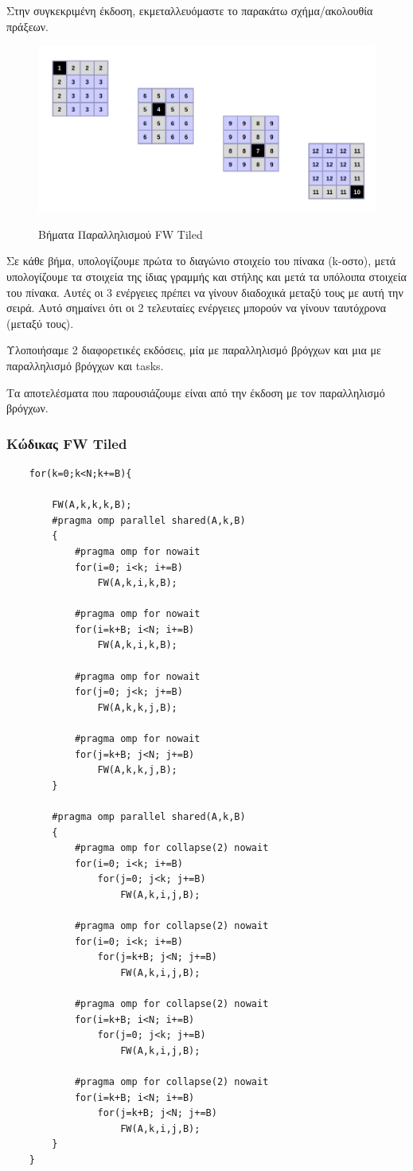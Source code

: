\documentclass[letterpaper,12pt]{article}
\begin{document}
Στην συγκεκριμένη έκδοση, εκμεταλλευόμαστε το παρακάτω σχήμα/ακολουθία πράξεων.

\begin{figure}[H]
    \centering
    \caption{Βήματα Παραλληλισμού FW Tiled}
    \includegraphics[scale=0.5]{tiledDependencies.png}
    \label{fig: Βήματα Παραλληλισμού FW Tiled}
\end{figure}

Σε κάθε βήμα, υπολογίζουμε πρώτα το διαγώνιο στοιχείο του πίνακα (k-οστο),
μετά υπολογίζουμε τα στοιχεία της ίδιας γραμμής και στήλης και μετά τα υπόλοιπα
στοιχεία του πίνακα. Αυτές οι 3 ενέργειες πρέπει να γίνουν διαδοχικά μεταξύ τους με
αυτή την σειρά. Αυτό σημαίνει ότι οι 2 τελευταίες ενέργειες μπορούν να γίνουν ταυτόχρονα (μεταξύ τους).

Υλοποιήσαμε 2 διαφορετικές εκδόσεις, μία με παραλληλισμό βρόγχων και μια με παραλληλισμό
βρόγχων και tasks.

Τα αποτελέσματα που παρουσιάζουμε είναι από την έκδοση με τον παραλληλισμό βρόγχων.

\subsubsection*{Κώδικας FW Tiled}


\begin{lstlisting}
    for(k=0;k<N;k+=B){

		FW(A,k,k,k,B);
		#pragma omp parallel shared(A,k,B)
		{
			#pragma omp for nowait
			for(i=0; i<k; i+=B)
				FW(A,k,i,k,B);

			#pragma omp for nowait
			for(i=k+B; i<N; i+=B)
				FW(A,k,i,k,B);

			#pragma omp for nowait
			for(j=0; j<k; j+=B)
				FW(A,k,k,j,B);

			#pragma omp for nowait
			for(j=k+B; j<N; j+=B)	
				FW(A,k,k,j,B);
		}

		#pragma omp parallel shared(A,k,B)
		{
			#pragma omp for collapse(2) nowait
			for(i=0; i<k; i+=B)
				for(j=0; j<k; j+=B)
					FW(A,k,i,j,B);

			#pragma omp for collapse(2) nowait
			for(i=0; i<k; i+=B)
				for(j=k+B; j<N; j+=B)
					FW(A,k,i,j,B);

			#pragma omp for collapse(2) nowait
			for(i=k+B; i<N; i+=B)
				for(j=0; j<k; j+=B)
					FW(A,k,i,j,B);

			#pragma omp for collapse(2) nowait
			for(i=k+B; i<N; i+=B)
				for(j=k+B; j<N; j+=B)
					FW(A,k,i,j,B);
		}
	}
\end{lstlisting}
\end{document}
